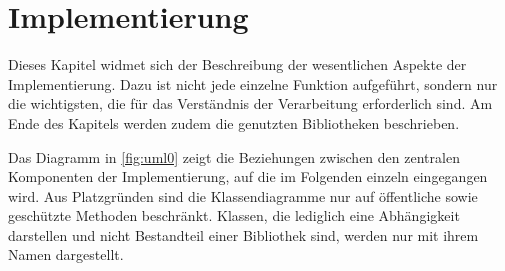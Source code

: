 \chapter{Implementierung}
Dieses Kapitel widmet sich der Beschreibung der wesentlichen Aspekte der Implementierung.
Dazu ist nicht jede einzelne Funktion aufgeführt, sondern nur die wichtigsten, die für das Verständnis der Verarbeitung erforderlich sind.
Am Ende des Kapitels werden zudem die genutzten Bibliotheken beschrieben.

Das Diagramm in \autoref{fig:uml0} zeigt die Beziehungen zwischen den zentralen Komponenten der Implementierung, auf die im Folgenden einzeln eingegangen wird.
Aus Platzgründen sind die Klassendiagramme nur auf öffentliche sowie geschützte Methoden beschränkt.
Klassen, die lediglich eine Abhängigkeit darstellen und nicht Bestandteil einer Bibliothek sind, werden nur mit ihrem Namen dargestellt.













